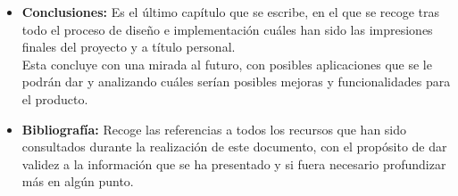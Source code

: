 \begin{itemize}
    \item \textbf{Conclusiones:} Es el último capítulo que se escribe, en el que se recoge tras todo el proceso de diseño e implementación cuáles han sido las impresiones finales del proyecto y a título personal. \\ Esta concluye con una mirada al futuro, con posibles aplicaciones que se le podrán dar y analizando cuáles serían posibles mejoras y funcionalidades para el producto. 
    \item \textbf{Bibliografía:} Recoge las referencias a todos los recursos que han sido consultados durante la realización de este documento, con el propósito de dar validez a la información que se ha presentado y si fuera necesario profundizar más en algún punto.
\end{itemize}